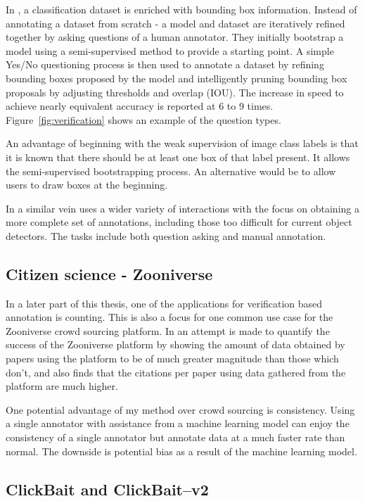 In \cite{Papadopoulos2016}, a classification dataset is enriched with bounding box information. Instead of annotating a dataset from scratch - a model and dataset are iteratively refined together by asking questions of a human annotator. They initially bootstrap a model using a semi-supervised method  \cite{Cinbis2017} to provide a starting point. A simple Yes/No questioning process is then used to annotate a dataset by refining bounding boxes proposed by the model and intelligently pruning bounding box proposals by adjusting thresholds and overlap (\gls{IOU}). The increase in speed to achieve nearly equivalent accuracy is reported at 6 to 9 times.  Figure~\ref{fig:verification} shows an example of the question types.

An advantage of beginning with the weak supervision of image class labels is that it is known that there should be at least one box of that label present. It allows the semi-supervised bootstrapping process. An alternative would be to allow users to draw boxes at the beginning. 

In a similar vein \cite{Russakovsky2015a} uses a wider variety of interactions with the focus on obtaining a more complete set of annotations, including those too difficult for current object detectors. The tasks include both question asking and manual annotation.


\subsection{Citizen science - Zooniverse \cite{Zooniverse}}

In a later part of this thesis, one of the applications for verification based annotation is counting. This is also a focus for one common use case for the Zooniverse crowd sourcing platform. In \cite{Watson2018} an attempt is made to quantify the success of the Zooniverse platform by showing the amount of data obtained by papers using the platform to be of much greater magnitude than those which don't, and also finds that the citations per paper using data gathered from the platform are much higher. 

One potential advantage of my method over crowd sourcing is consistency. Using a single annotator with assistance from a machine learning model can enjoy the consistency of a single annotator but annotate data at a much faster rate than normal. The downside is potential bias as a result of the machine learning model.

\subsection{ClickBait and ClickBait--v2 \cite{Teng2017, Teng2018}}

